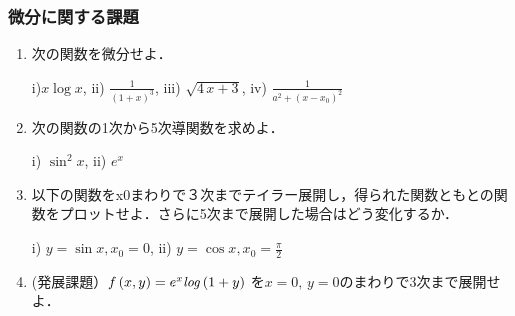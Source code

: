 \subsubsection{微分に関する課題}
\begin{enumerate}
\item
次の関数を微分せよ．

i)$ {x} \log x$, 
ii) $\displaystyle \frac{1}{  \left( 1+x \right) ^{3}}$, 
iii) $ \sqrt{4\,x+3}$, 
iv) $\displaystyle \frac{1}{ a^2+ \left( x-x_0 \right)^2 }$

\item
次の関数の1次から5次導関数を求めよ．

i) $\sin^2 x$, 
ii) ${e}^{x}$

\item 以下の関数をx0まわりで３次までテイラー展開し，得られた関数ともとの関数をプロットせよ．さらに5次まで展開した場合はどう変化するか．

i) $ y=\sin x, x_0=0 $, 
ii) $\displaystyle y=\cos x, x_0=\frac{\pi}{2}$

\item
(発展課題）$f \left( x,y \right) ={e}^{x}{\it log} \left( 1+y \right) $
を$\displaystyle x=0,\,y=0$のまわりで3次まで展開せよ．

\end{enumerate}
